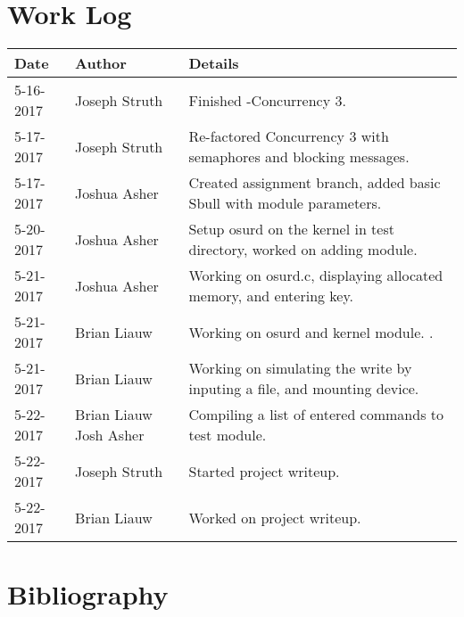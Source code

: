 \documentclass[10pt,draftclsnofoot,onecolumn, compsoc]{IEEEtran}
\begin{document}
\section{Work Log}

\begin{tabular}{| l | l | p{15cm} |}\textbf{Date} & \textbf{Author} & \textbf{Details}\\\hline
5-16-2017 & Joseph Struth & Finished -Concurrency 3.\\\hline
5-17-2017 & Joseph Struth & Re-factored Concurrency 3 with semaphores and blocking messages.\\\hline
5-17-2017 & Joshua Asher & Created assignment branch, added basic Sbull with module parameters.\\\hline
5-20-2017 & Joshua Asher & Setup osurd on the kernel in test directory, worked on adding module.\\\hline
5-21-2017 & Joshua Asher & Working on osurd.c, displaying allocated memory, and entering key.\\\hline
5-21-2017 & Brian Liauw & Working on osurd and kernel module. .\\\hline
5-21-2017 & Brian Liauw & Working on simulating the write by inputing a file, and mounting device.\\\hline
5-22-2017 & Brian Liauw Josh Asher & Compiling a list of entered commands to test module.\\\hline
5-22-2017 & Joseph Struth & Started project writeup.\\\hline
5-22-2017 & Brian Liauw & Worked on project writeup.\\\hline
\end{tabular}

\section{Bibliography}
\nocite{*}


\end{document}
